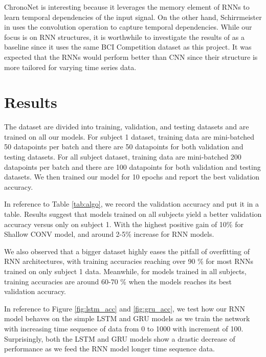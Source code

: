 \documentclass[10pt,twocolumn,letterpaper]{article}
\begin{document}
ChronoNet is interesting because it leverages the memory element of RNNs to learn temporal dependencies of the input signal. On the other hand, Schirrmeister in \cite{CNN} uses the convolution operation to capture temporal dependencies. While our focus is on RNN structures, it is worthwhile to investigate the results of \cite{CNN} as a baseline since it uses the same BCI Competition dataset as this project. It was expected that the RNNs would perform better than CNN since their structure is more tailored for varying time series data.

\section{Results}
The dataset are divided into training, validation, and testing datasets and are trained on all our models. For subject 1 dataset, training data are mini-batched 50 datapoints per batch and there are 50 datapoints for both validation and testing datasets. For all subject dataset, training data are mini-batched 200 datapoints per batch and there are 100 datapoints for both validation and testing datasets. We then trained our model for 10 epochs and report the best validation accuracy. \par

In reference to Table \ref{tab:algo}, we record the validation accuracy and put it in a table. Results suggest that models trained on all subjects yield a better validation accuracy versus only on subject 1. With the highest positive gain of 10\% for Shallow CONV model, and around 2-5\% increase for RNN models. \par

We also observed that a bigger dataset highly eases the pitfall of overfitting of RNN architectures, with training accuracies reaching over 90 \% for most RNNs trained on only subject 1 data. Meanwhile, for models trained in all subjects, training accuracies are around 60-70 \% when the models reaches its best validation accuracy. \par

In reference to Figure \ref{fig:lstm_acc} and \ref{fig:gru_acc}, we test how our RNN model behaves on the simple LSTM and GRU models as we train the network with increasing time sequence of data from 0 to 1000 with increment of 100. Surprisingly, both the LSTM and GRU models show a drastic decrease of performance as we feed the RNN model longer time sequence data. \par
\end{document}
